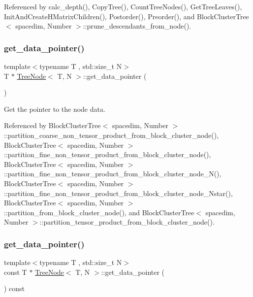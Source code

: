Referenced by calc\+\_\+depth(), Copy\+Tree(), Count\+Tree\+Nodes(), Get\+Tree\+Leaves(), Init\+And\+Create\+H\+Matrix\+Children(), Postorder(), Preorder(), and Block\+Cluster\+Tree$<$ spacedim, Number $>$\+::prune\+\_\+descendants\+\_\+from\+\_\+node().

\mbox{\label{classTreeNode_aaa2ba047902c4e2fccffe3424a0c665b}} 
\subsubsection{\texorpdfstring{get\+\_\+data\+\_\+pointer()}{get\_data\_pointer()}\hspace{0.1cm}{\footnotesize\ttfamily [1/2]}}
{\footnotesize\ttfamily template$<$typename T , std\+::size\+\_\+t N$>$ \\
T $\ast$ \hyperlink{classTreeNode}{Tree\+Node}$<$ T, N $>$\+::get\+\_\+data\+\_\+pointer (\begin{DoxyParamCaption}{ }\end{DoxyParamCaption})}

Get the pointer to the node data. 

Referenced by Block\+Cluster\+Tree$<$ spacedim, Number $>$\+::partition\+\_\+coarse\+\_\+non\+\_\+tensor\+\_\+product\+\_\+from\+\_\+block\+\_\+cluster\+\_\+node(), Block\+Cluster\+Tree$<$ spacedim, Number $>$\+::partition\+\_\+fine\+\_\+non\+\_\+tensor\+\_\+product\+\_\+from\+\_\+block\+\_\+cluster\+\_\+node(), Block\+Cluster\+Tree$<$ spacedim, Number $>$\+::partition\+\_\+fine\+\_\+non\+\_\+tensor\+\_\+product\+\_\+from\+\_\+block\+\_\+cluster\+\_\+node\+\_\+\+N(), Block\+Cluster\+Tree$<$ spacedim, Number $>$\+::partition\+\_\+fine\+\_\+non\+\_\+tensor\+\_\+product\+\_\+from\+\_\+block\+\_\+cluster\+\_\+node\+\_\+\+Nstar(), Block\+Cluster\+Tree$<$ spacedim, Number $>$\+::partition\+\_\+from\+\_\+block\+\_\+cluster\+\_\+node(), and Block\+Cluster\+Tree$<$ spacedim, Number $>$\+::partition\+\_\+tensor\+\_\+product\+\_\+from\+\_\+block\+\_\+cluster\+\_\+node().

\mbox{\label{classTreeNode_ac6894ba6488ee38978ef2476366f6318}} 
\subsubsection{\texorpdfstring{get\+\_\+data\+\_\+pointer()}{get\_data\_pointer()}\hspace{0.1cm}{\footnotesize\ttfamily [2/2]}}
{\footnotesize\ttfamily template$<$typename T , std\+::size\+\_\+t N$>$ \\
const T $\ast$ \hyperlink{classTreeNode}{Tree\+Node}$<$ T, N $>$\+::get\+\_\+data\+\_\+pointer (\begin{DoxyParamCaption}{ }\end{DoxyParamCaption}) const}

